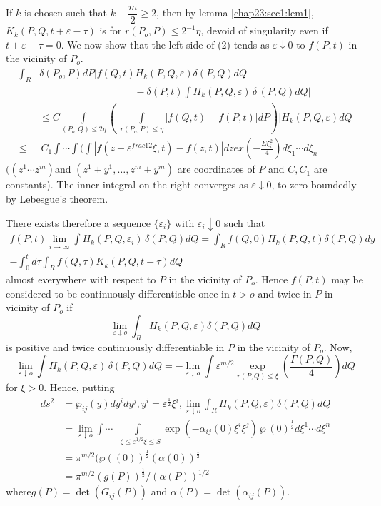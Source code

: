 If $k$ is chosen such that $k- \dfrac{m}{2} \ge 2$, then by lemma \ref{chap23:sec1:lem1},
$K_k(P,Q, t+ \varepsilon - \tau)$ is for $r(P_o, P)\le 2^{-1} \eta$,
devoid of singularity even if $t +\varepsilon - \tau =0$. We now show
that the left side of (2) tends as $\varepsilon \downarrow 0$ to
$f(P,t)$ in the vicinity of $P_o$. 
\begin{align*}
 \int_R & \delta(P_o, P) dP | f(Q, t) H_k (P,Q, \varepsilon) \delta (P,
 Q) d Q\\ 
 & \hspace{4cm}- \delta(P,t) \int H_k (P,Q, \varepsilon)\, \delta\, (P, Q) dQ | \\
 & \le C \int\limits_{(P_o, Q)\le 2 \eta} \left(~\int\limits_{r(P_o,
  P) \le \eta} | f(Q,t)- f(P,t)| dP \right) |H_k (P,Q,\varepsilon
 ) dQ \\ 
 \le &\, C_1 \int \cdots \int \Big(\int | f(z+ \varepsilon^{frac{1}{2}}
  \xi, t) - f(z,t)| d z ex \left( - \frac{\Sigma \xi^2_i}{4}\right) d \xi_1
 \cdots d \xi_n 
\end{align*}
$((z^1 \cdots z^m)$\pageoriginale and $(z^1 + y^1, \ldots, z^m +y^m)$ are
coordinates of $P$ and $C, C_1$ are constants). The inner integral on
the right converges as $\varepsilon \downarrow 0$, to zero boundedly
by Lebesgue's theorem. 

There exists therefore a sequence $\{\varepsilon_i\}$ with
$\varepsilon_i \downarrow 0$ such that 
{\fontsize{10pt}{12pt}\selectfont
\begin{multline*}
 f(P,t) \lim_{i \to \infty} \int H_k (P,Q, \varepsilon_i)\, \delta(P,Q) d Q
 = \int_R f(Q,0) H_k (P,Q,t) \delta (P,Q) dy\\ 
 - \int^t_0 d \tau \int_R
 f(Q,\tau) K_k (P,Q, t- \tau ) dQ 
\end{multline*}}\relax
almost everywhere with respect to $P$ in the vicinity of $P_o$. Hence
$f(P,t)$ may be considered to be continuously differentiable once in $t>
o$ and twice in $P$ in vicinity of $P_o$ if 
$$
\lim_{\varepsilon \downarrow o} \int_R H_k (P,Q,\varepsilon ) \delta (P,Q) dQ
$$
is positive and twice continuously differentiable in $P$ in the
vicinity of $P_o$. Now,
$$
\lim\limits_{\varepsilon \downarrow o} \int H_k (P, Q, \varepsilon)\,
\delta (P,Q)d Q = - \lim\limits_{\varepsilon \downarrow o} \int
\varepsilon^{m/2} \underset{r(P,Q) \le \xi}{\exp} \left(\frac{\Gamma(P,Q)}{4}\right) dQ 
$$
for $\xi > 0$. Hence, putting
\begin{align*}
ds^2 & = \wp_{ij} (y) dy^i dy^j, y^i = \varepsilon^{\frac{1}{2}} \xi^i,
\lim_{\varepsilon \downarrow o} \int_R H_k(P,Q, \varepsilon) \delta (P,Q) d Q\\
 &=\lim_{\varepsilon \downarrow o} \int \cdots \int\limits_{- \zeta
  \le \varepsilon^{1/2} \xi \le S} \exp (- \alpha_{ij}(0) \xi^i
 \xi^j ) \,\wp\, (0)^{\frac{1}{2}} d \xi^1 \cdots d \xi^n \\ 
 &= \pi^{m/2} ( \wp ((0))^{\frac{1}{2}} (\alpha (0))^{\frac{1}{2}} \\
 &= \pi^{m/2}(g(P))^{\frac{1}{2}} / ( \alpha (P))^{1/2}
\end{align*}
where\pageoriginale $g(P)= \det(G_{ij} (P))$ and $\alpha (P)= \det (\alpha_{ij}(P))$.

